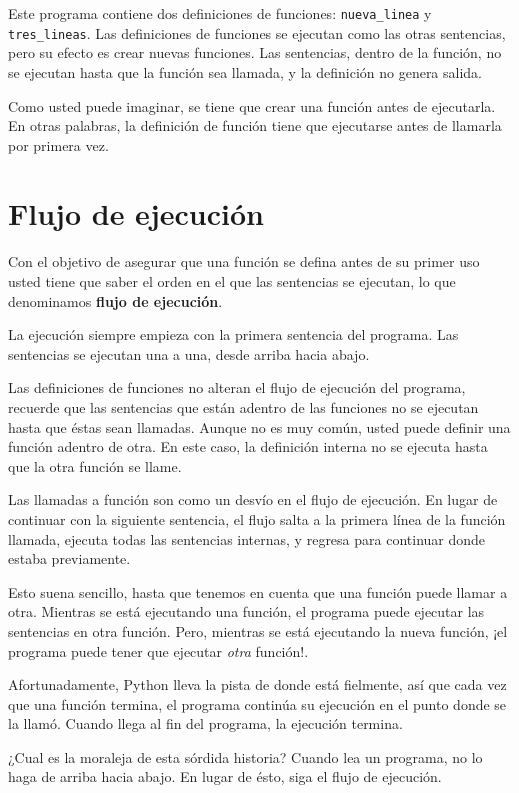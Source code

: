 Este programa contiene dos definiciones de funciones: \texttt{nueva\_linea} y
\texttt{tres\_lineas}. Las definiciones de funciones se ejecutan como 
las otras sentencias, pero su efecto es crear nuevas funciones. Las
sentencias, dentro de la función, no se ejecutan hasta que la función
sea llamada, y la definición no genera salida.

Como usted puede imaginar, se tiene que crear una función antes de
ejecutarla. En otras palabras, la definición de función tiene que
ejecutarse antes de llamarla por primera vez.

\section{Flujo de ejecución}

Con el objetivo de asegurar que una función se defina antes de su 
primer uso usted tiene que saber el orden en el que las sentencias
se ejecutan, lo que denominamos {\bf flujo de ejecución}.

La ejecución siempre empieza con la primera sentencia del programa. Las 
sentencias se ejecutan una a una, desde arriba hacia abajo.

Las definiciones de funciones no alteran el flujo de ejecución del programa, 
recuerde que las sentencias que están adentro de las funciones no se ejecutan 
hasta que éstas sean llamadas. Aunque no es muy común, usted puede definir una 
función adentro de otra.
En este caso, la definición interna no se ejecuta hasta que la otra función se llame.

Las llamadas a función son como un desvío en el flujo de ejecución. En lugar de
continuar con la siguiente sentencia, el flujo salta a la primera línea de la 
función llamada, ejecuta todas las sentencias internas, y regresa para 
continuar donde estaba previamente.

Esto suena sencillo, hasta que tenemos en cuenta que una función puede llamar a 
otra. Mientras  se está ejecutando una función, el programa puede ejecutar las 
sentencias en otra función. Pero, mientras se está ejecutando la nueva función, 
¡el programa puede tener que ejecutar \textit{otra} función!.

Afortunadamente, Python lleva la pista de donde está fielmente, así que cada vez
que una función termina, el programa continúa su ejecución en el punto donde se 
la llamó. Cuando llega al fin del programa, la ejecución termina.

¿Cual es la moraleja de esta sórdida historia? Cuando lea un programa, no lo 
haga de arriba hacia abajo. En lugar de ésto, siga el flujo de ejecución.

